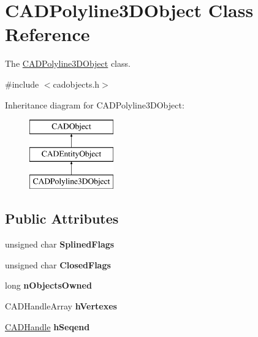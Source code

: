 \hypertarget{class_c_a_d_polyline3_d_object}{}\section{C\+A\+D\+Polyline3\+D\+Object Class Reference}
\label{class_c_a_d_polyline3_d_object}


The \hyperlink{class_c_a_d_polyline3_d_object}{C\+A\+D\+Polyline3\+D\+Object} class.  




{\ttfamily \#include $<$cadobjects.\+h$>$}

Inheritance diagram for C\+A\+D\+Polyline3\+D\+Object\+:\begin{figure}[H]
\begin{center}
\leavevmode
\includegraphics[height=3.000000cm]{class_c_a_d_polyline3_d_object}
\end{center}
\end{figure}
\subsection*{Public Attributes}
\begin{DoxyCompactItemize}
\item 
unsigned char {\bfseries Splined\+Flags}\hypertarget{class_c_a_d_polyline3_d_object_a064001f6e2f90b3353e3ce41d6142079}{}\label{class_c_a_d_polyline3_d_object_a064001f6e2f90b3353e3ce41d6142079}

\item 
unsigned char {\bfseries Closed\+Flags}\hypertarget{class_c_a_d_polyline3_d_object_a416329b6ed16e4a8b780bc7743c50aa7}{}\label{class_c_a_d_polyline3_d_object_a416329b6ed16e4a8b780bc7743c50aa7}

\item 
long {\bfseries n\+Objects\+Owned}\hypertarget{class_c_a_d_polyline3_d_object_a01da80ee82396bdaf2d63372cda6d4db}{}\label{class_c_a_d_polyline3_d_object_a01da80ee82396bdaf2d63372cda6d4db}

\item 
C\+A\+D\+Handle\+Array {\bfseries h\+Vertexes}\hypertarget{class_c_a_d_polyline3_d_object_abc707d36558de2a3436ea11ccb407f11}{}\label{class_c_a_d_polyline3_d_object_abc707d36558de2a3436ea11ccb407f11}

\item 
\hyperlink{class_c_a_d_handle}{C\+A\+D\+Handle} {\bfseries h\+Seqend}\hypertarget{class_c_a_d_polyline3_d_object_a617db6737f650841b8a4bca01fde9537}{}\label{class_c_a_d_polyline3_d_object_a617db6737f650841b8a4bca01fde9537}

\end{DoxyCompactItemize}
